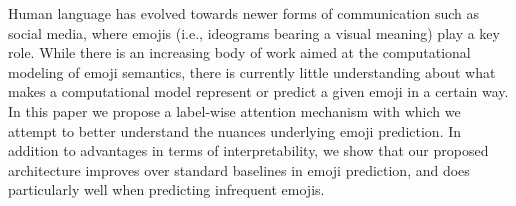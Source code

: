 Human language has evolved towards newer forms of communication such as social media, where emojis (i.e., ideograms bearing a visual meaning) play a key role. While there is an increasing body of work aimed at the computational modeling of emoji semantics, there is currently little understanding about what makes a computational model represent or predict a given emoji in a certain way. In this paper we propose a label-wise attention mechanism with which we attempt to better understand the nuances underlying emoji prediction. In addition to advantages in terms of interpretability, we show that our proposed architecture improves over standard baselines in emoji prediction, and does particularly well when predicting infrequent emojis.
